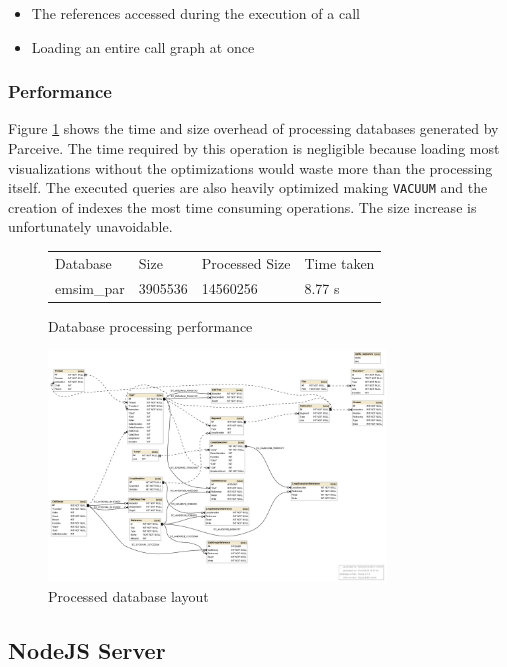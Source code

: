 \begin{itemize}
	\item The references accessed during the execution of a call
	\item Loading an entire call graph at once
\end{itemize}

\subsubsection{Performance}

Figure \ref{parceive:procperformance} shows the time and size overhead of processing databases generated by Parceive. The time required by this operation is negligible because loading most visualizations without the optimizations would waste more than the processing itself. The executed queries are also heavily optimized making \texttt{VACUUM} and the creation of indexes the most time consuming operations. The size increase is unfortunately unavoidable.

\begin{figure}
	\centering
	\begin{tabular}{l l l l}
		Database & Size & Processed Size & Time taken \\
		emsim\_par & 3905536 & 14560256 & 8.77 s
	\end{tabular}
	\caption{Database processing performance}
	\label{parceive:procperformance}
\end{figure}

\begin{figure}
	\centering
	\includegraphics[width=0.8\textwidth]{full-schema}
	\caption{Processed database layout}
	\label{parceive:proclayout}
\end{figure}

\subsection{NodeJS Server}

